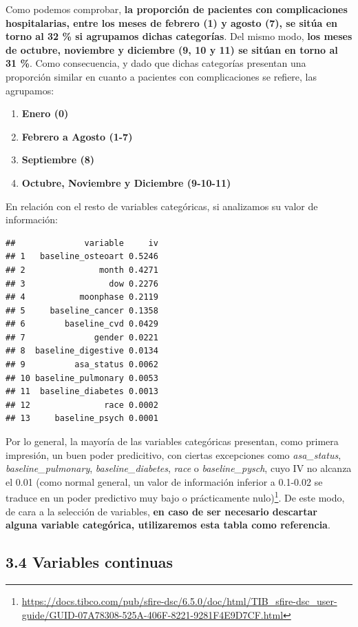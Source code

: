 \documentclass[
]{article}
\providecommand{\tightlist}{%
  \setlength{\itemsep}{0pt}\setlength{\parskip}{0pt}}
\begin{document}
Como podemos comprobar, \textbf{la proporción de pacientes con
complicaciones hospitalarias, entre los meses de febrero (1) y agosto
(7), se sitúa en torno al 32 \% si agrupamos dichas categorías}. Del
mismo modo, \textbf{los meses de octubre, noviembre y diciembre (9, 10 y
11) se sitúan en torno al 31 \%}. Como consecuencia, y dado que dichas
categorías presentan una proporción similar en cuanto a pacientes con
complicaciones se refiere, las agrupamos:

\begin{enumerate}
\def\labelenumi{\arabic{enumi}.}
\tightlist
\item
  \textbf{Enero (0)}
\item
  \textbf{Febrero a Agosto (1-7)}
\item
  \textbf{Septiembre (8)}
\item
  \textbf{Octubre, Noviembre y Diciembre (9-10-11)}
\end{enumerate}

En relación con el resto de variables categóricas, si analizamos su
valor de información:

\begin{verbatim}
##              variable     iv
## 1   baseline_osteoart 0.5246
## 2               month 0.4271
## 3                 dow 0.2276
## 4           moonphase 0.2119
## 5     baseline_cancer 0.1358
## 6        baseline_cvd 0.0429
## 7              gender 0.0221
## 8  baseline_digestive 0.0134
## 9          asa_status 0.0062
## 10 baseline_pulmonary 0.0053
## 11  baseline_diabetes 0.0013
## 12               race 0.0002
## 13     baseline_psych 0.0001
\end{verbatim}

Por lo general, la mayoría de las variables categóricas presentan, como
primera impresión, un buen poder predicitivo, con ciertas excepciones
como \emph{asa\_status}, \emph{baseline\_pulmonary},
\emph{baseline\_diabetes}, \emph{race} o \emph{baseline\_pysch}, cuyo IV
no alcanza el 0.01 (como normal general, un valor de información
inferior a 0.1-0.02 se traduce en un poder predictivo muy bajo o
prácticamente nulo)\footnote{\url{https://docs.tibco.com/pub/sfire-dsc/6.5.0/doc/html/TIB_sfire-dsc_user-guide/GUID-07A78308-525A-406F-8221-9281F4E9D7CF.html}}.
De este modo, de cara a la selección de variables, \textbf{en caso de
ser necesario descartar alguna variable categórica, utilizaremos esta
tabla como referencia}.

\hypertarget{variables-continuas}{%
\subsection{3.4 Variables continuas}\label{variables-continuas}}
\end{document}
